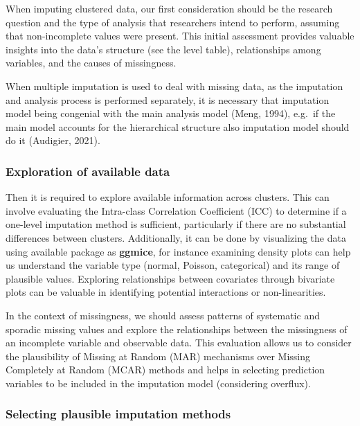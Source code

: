 \documentclass[
]{jss}
\begin{document}
When imputing clustered data, our first consideration should be the
research question and the type of analysis that researchers intend to
perform, assuming that non-incomplete values were present. This initial
assessment provides valuable insights into the data's structure (see the
level table), relationships among variables, and the causes of
missingness.

When multiple imputation is used to deal with missing data, as the
imputation and analysis process is performed separately, it is necessary
that imputation model being congenial with the main analysis model
(Meng, 1994), e.g.~if the main model accounts for the hierarchical
structure also imputation model should do it (Audigier, 2021).

\hypertarget{exploration-of-available-data}{%
\subsubsection{Exploration of available
data}\label{exploration-of-available-data}}

Then it is required to explore available information across clusters.
This can involve evaluating the Intra-class Correlation Coefficient
(ICC) to determine if a one-level imputation method is sufficient,
particularly if there are no substantial differences between clusters.
Additionally, it can be done by visualizing the data using available
package as \textbf{ggmice}, for instance examining density plots can
help us understand the variable type (normal, Poisson, categorical) and
its range of plausible values. Exploring relationships between
covariates through bivariate plots can be valuable in identifying
potential interactions or non-linearities.

In the context of missingness, we should assess patterns of systematic
and sporadic missing values and explore the relationships between the
missingness of an incomplete variable and observable data. This
evaluation allows us to consider the plausibility of Missing at Random
(MAR) mechanisms over Missing Completely at Random (MCAR) methods and
helps in selecting prediction variables to be included in the imputation
model (considering overflux).

\hypertarget{selecting-plausible-imputation-methods}{%
\subsubsection{Selecting plausible imputation
methods}\label{selecting-plausible-imputation-methods}}
\end{document}
